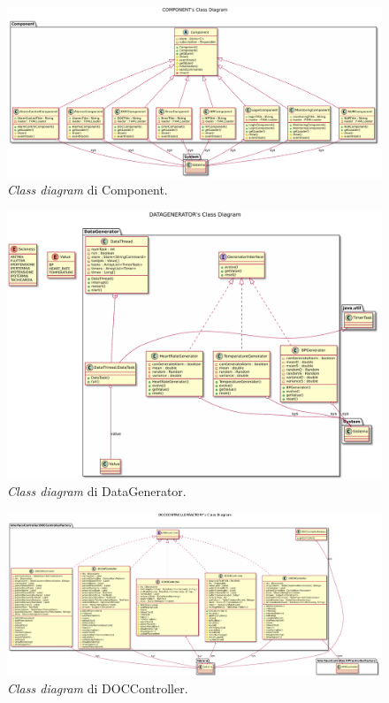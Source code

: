 \documentclass[final, smallexted]{svjour3}
\begin{document}
\begin{landscape}
	\begin{figure}
		\includegraphics[scale=.6]{ClassDiagramImages/Component.pdf}
		\caption{\textit{Class diagram} di Component.}\label{componentclassdiagram}
	\end{figure}
\end{landscape}

\begin{landscape}
	\begin{figure}
		\includegraphics[scale=.7]{ClassDiagramImages/DataGenerator.pdf}
		\caption{\textit{Class diagram} di DataGenerator.}\label{datageneratorclassdiagram}
	\end{figure}
\end{landscape}


\begin{landscape}
	\begin{figure}
		\includegraphics[scale=.45]{ClassDiagramImages/DOCController.pdf}
		\caption{\textit{Class diagram} di DOCController.}\label{doccontrollerclassdiagram}
	\end{figure}
\end{landscape}
\end{document}
